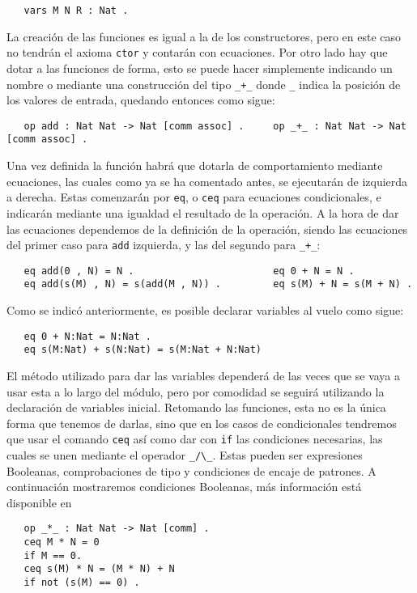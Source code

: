 {\codesize
\begin{verbatim}
   vars M N R : Nat .
\end{verbatim}
}

La creación de las funciones es igual a la de los constructores, pero en este caso no tendrán el axioma \texttt{ctor} y contarán con ecuaciones. Por otro lado hay que dotar a las funciones de forma, esto se puede hacer simplemente indicando un nombre o mediante una construcción del tipo \verb"_+_" donde \verb"_" indica la posición de los valores de entrada, quedando entonces como sigue: \par

{\codesize
\begin{verbatim}
   op add : Nat Nat -> Nat [comm assoc] .     op _+_ : Nat Nat -> Nat [comm assoc] .
\end{verbatim}
}

Una vez definida la función habrá que dotarla de comportamiento mediante ecuaciones, las cuales como ya se ha comentado antes, se ejecutarán de izquierda a derecha. Estas comenzarán por \texttt{eq}, o \texttt{ceq} para ecuaciones condicionales, e indicarán mediante una igualdad el resultado de la operación. A la hora de dar las ecuaciones dependemos de la definición de la operación, siendo las ecuaciones del primer caso para \verb"add" izquierda, y las del segundo para \verb"_+_": \par
{\codesize
\begin{verbatim}
   eq add(0 , N) = N .                        eq 0 + N = N .
   eq add(s(M) , N) = s(add(M , N)) .         eq s(M) + N = s(M + N) .
\end{verbatim}
}

Como se indicó anteriormente, es posible declarar variables al vuelo como sigue: \par
{\codesize
\begin{verbatim}
   eq 0 + N:Nat = N:Nat .
   eq s(M:Nat) + s(N:Nat) = s(M:Nat + N:Nat) 
\end{verbatim}
}
 
El método utilizado para dar las variables dependerá de las veces que se vaya a usar esta a lo largo del módulo, pero por comodidad se seguirá utilizando la declaración de variables inicial. Retomando las funciones, esta no es la única forma que tenemos de darlas, sino que en los casos de condicionales tendremos que usar el comando \texttt{ceq} así como dar con \texttt{if} las condiciones necesarias, las cuales se unen mediante el operador \verb"_/\_". Estas pueden ser expresiones Booleanas, comprobaciones de tipo y condiciones de encaje de patrones. A continuación mostraremos condiciones Booleanas, más información está disponible en ~\cite{maudeBook}
{\codesize
\begin{verbatim}
   op _*_ : Nat Nat -> Nat [comm] .
   ceq M * N = 0 
   if M == 0.
   ceq s(M) * N = (M * N) + N
   if not (s(M) == 0) .
\end{verbatim}
}

